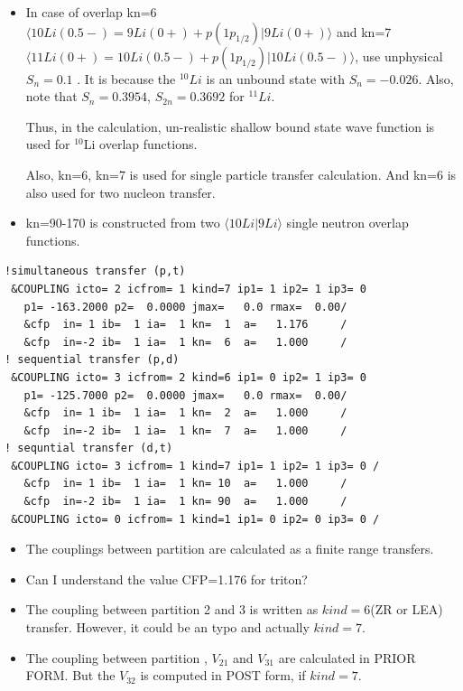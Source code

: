 \documentclass[11pt]{book}
\def\la{\langle}
\def\ra{\rangle}
\begin{document}
\begin{itemize}            
           
\item In case of overlap   
      kn=6 $\la 10Li(0.5-)=9Li(0+)+p(1p_{1/2})|9Li(0+)\ra$ and
      kn=7 $\la 11Li(0+)=10Li(0.5-)+p(1p_{1/2})|10Li(0.5-)\ra$,
      use unphysical $S_n=0.1$ . 
      It is because the $^{10}Li$ is an unbound state
      with $S_n=-0.026$. 
      Also, note that $S_n=0.3954$, 
      $S_{2n}=0.3692$ for $^{11}Li$. 
      
      Thus, in the calculation, un-realistic shallow bound state
      wave function is used for $^{10}$Li overlap functions.  
      
      Also, kn=6, kn=7 is used for single particle transfer
      calculation. And kn=6 is also used for two nucleon transfer.
\item  kn=90-170 is constructed from two $\la 10Li|9Li\ra$ 
       single neutron overlap functions.      
\end{itemize}
\begin{small} 
\begin{lstlisting}[frame=single]   
!simultaneous transfer (p,t)          
 &COUPLING icto= 2 icfrom= 1 kind=7 ip1= 1 ip2= 1 ip3= 0                        
   p1= -163.2000 p2=  0.0000 jmax=   0.0 rmax=  0.00/                           
   &cfp  in= 1 ib=  1 ia=  1 kn=  1  a=   1.176     /                           
   &cfp  in=-2 ib=  1 ia=  1 kn=  6  a=   1.000     /                           
! sequential transfer (p,d)   
 &COUPLING icto= 3 icfrom= 2 kind=6 ip1= 0 ip2= 1 ip3= 0                        
   p1= -125.7000 p2=  0.0000 jmax=   0.0 rmax=  0.00/                           
   &cfp  in= 1 ib=  1 ia=  1 kn=  2  a=   1.000     /                           
   &cfp  in=-2 ib=  1 ia=  1 kn=  7  a=   1.000     /                           
! sequntial transfer (d,t)   
 &COUPLING icto= 3 icfrom= 1 kind=7 ip1= 1 ip2= 1 ip3= 0 /                      
   &cfp  in= 1 ib=  1 ia=  1 kn= 10  a=   1.000     /                           
   &cfp  in=-2 ib=  1 ia=  1 kn= 90  a=   1.000     /                           
 &COUPLING icto= 0 icfrom= 1 kind=1 ip1= 0 ip2= 0 ip3= 0 /   
\end{lstlisting}
\end{small}
\begin{itemize}
\item  The couplings between partition are calculated as
       a finite range transfers.       
\item Can I understand the value CFP=1.176 
       for triton? 
\item The coupling between partition 2 and 3 is written as $kind=6$(ZR or LEA) transfer.
      However, it could be an typo and actually $kind=7$. 
\item The coupling between partition , $V_{21}$ and $V_{31}$ are calculated in PRIOR FORM.
      But the $V_{32}$ is computed in POST form, if $kind=7$. 
    
\end{itemize}
\end{document}

